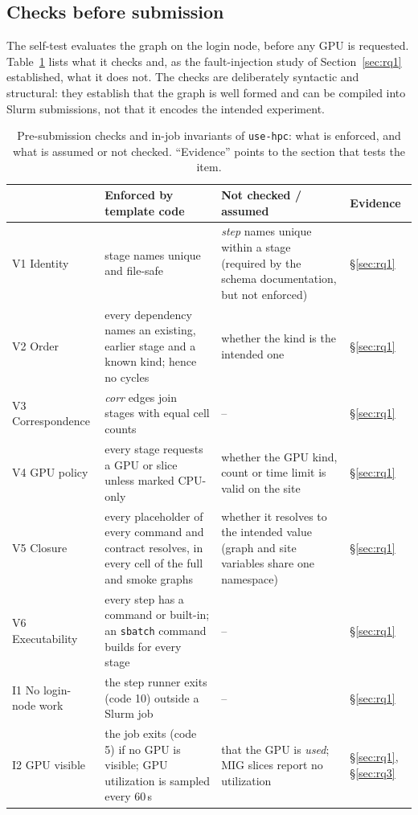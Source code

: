 \documentclass[pdflatex,sn-mathphys-num]{sn-jnl}
\theoremstyle{thmstyletwo}%
\theoremstyle{thmstylethree}%
\newcommand{\tool}{\texttt{use-hpc}}
\newcommand{\code}[1]{\texttt{#1}}
\newcommand{\V}[1]{\textsf{V#1}}
\newcommand{\I}[1]{\textsf{I#1}}
\begin{document}
\subsection{Checks before submission}\label{sec:validate}

The self-test evaluates the graph on the login node, before any GPU is requested. Table~\ref{tab:checks} lists what it checks and, as the fault-injection study of Section~\ref{sec:rq1} established, what it does not. The checks are deliberately syntactic and structural: they establish that the graph is well formed and can be compiled into Slurm submissions, not that it encodes the intended experiment.

\begin{table}[t]
\centering\small
\caption{Pre-submission checks and in-job invariants of \tool{}: what is enforced, and what is assumed or not checked. ``Evidence'' points to the section that tests the item.}\label{tab:checks}
\begin{tabularx}{\textwidth}{@{}l >{\raggedright\arraybackslash}X >{\raggedright\arraybackslash}X l@{}}
\toprule
& Enforced by template code & Not checked / assumed & Evidence \\
\midrule
\V{1} Identity & stage names unique and file-safe & \emph{step} names unique within a stage (required by the schema documentation, but not enforced) & \S\ref{sec:rq1} \\
\V{2} Order & every dependency names an existing, earlier stage and a known kind; hence no cycles & whether the kind is the intended one & \S\ref{sec:rq1} \\
\V{3} Correspondence & \emph{corr} edges join stages with equal cell counts & -- & \S\ref{sec:rq1} \\
\V{4} GPU policy & every stage requests a GPU or slice unless marked CPU-only & whether the GPU kind, count or time limit is valid on the site & \S\ref{sec:rq1} \\
\V{5} Closure & every placeholder of every command and contract resolves, in every cell of the full and smoke graphs & whether it resolves to the intended value (graph and site variables share one namespace) & \S\ref{sec:rq1} \\
\V{6} Executability & every step has a command or built-in; an \code{sbatch} command builds for every stage & -- & \S\ref{sec:rq1} \\
\midrule
\I{1} No login-node work & the step runner exits (code 10) outside a Slurm job & -- & \S\ref{sec:rq1} \\
\I{2} GPU visible & the job exits (code 5) if no GPU is visible; GPU utilization is sampled every 60\,s & that the GPU is \emph{used}; MIG slices report no utilization & \S\ref{sec:rq1}, \S\ref{sec:rq3} \\

\end{tabularx}
\end{table}
\end{document}
